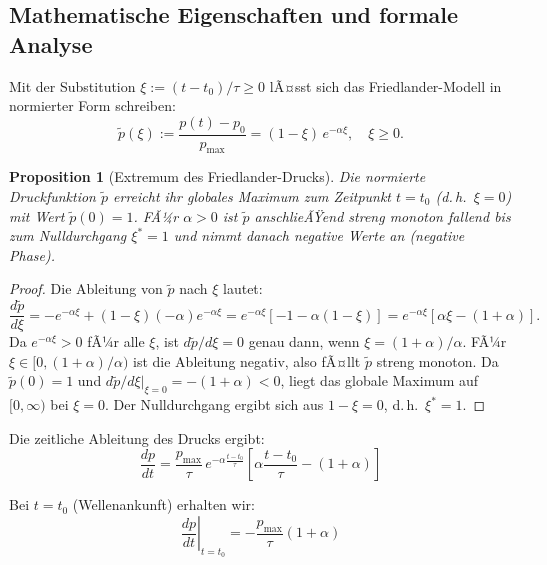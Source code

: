 ﻿\documentclass[12pt,a4paper]{article}
\newtheorem{proposition}[theorem]{Proposition}
\theoremstyle{definition}
\theoremstyle{remark}
\begin{document}
\subsection{Mathematische Eigenschaften und formale Analyse}

Mit der Substitution $\xi := (t - t_0)/\tau \geq 0$ lÃ¤sst sich das Friedlander-Modell in normierter Form schreiben:
\begin{equation}
\tilde{p}(\xi) := \frac{p(t) - p_0}{p_{\text{max}}} = (1 - \xi)\,e^{-\alpha\xi}, \quad \xi \geq 0.
\label{eq:friedlander_norm}
\end{equation}

\begin{proposition}[Extremum des Friedlander-Drucks]
\label{prop:friedlander_max}
Die normierte Druckfunktion $\tilde{p}$ erreicht ihr globales Maximum zum Zeitpunkt $t = t_0$ (d.\,h.~$\xi = 0$) mit Wert $\tilde{p}(0) = 1$. FÃ¼r $\alpha > 0$ ist $\tilde{p}$ anschlieÃŸend streng monoton fallend bis zum Nulldurchgang $\xi^* = 1$ und nimmt danach negative Werte an (negative Phase).
\end{proposition}
\begin{proof}
Die Ableitung von $\tilde{p}$ nach $\xi$ lautet:
\[
\frac{d\tilde{p}}{d\xi} = -e^{-\alpha\xi} + (1-\xi)(-\alpha)e^{-\alpha\xi} = e^{-\alpha\xi}[-1 - \alpha(1-\xi)] = e^{-\alpha\xi}[\alpha\xi - (1+\alpha)].
\]
Da $e^{-\alpha\xi} > 0$ fÃ¼r alle $\xi$, ist $d\tilde{p}/d\xi = 0$ genau dann, wenn $\xi = (1+\alpha)/\alpha$. FÃ¼r $\xi \in [0,(1+\alpha)/\alpha)$ ist die Ableitung negativ, also fÃ¤llt $\tilde{p}$ streng monoton. Da $\tilde{p}(0)=1$ und $d\tilde{p}/d\xi|_{\xi=0} = -(1+\alpha) < 0$, liegt das globale Maximum auf $[0,\infty)$ bei $\xi=0$. Der Nulldurchgang ergibt sich aus $1-\xi=0$, d.\,h.~$\xi^*=1$. 
\end{proof}

Die zeitliche Ableitung des Drucks ergibt:
\begin{equation}
\frac{dp}{dt} = \frac{p_{\text{max}}}{\tau}\,e^{-\alpha \frac{t-t_0}{\tau}} \left[ \alpha\frac{t-t_0}{\tau} - (1+\alpha) \right]
\end{equation}

Bei $t = t_0$ (Wellenankunft) erhalten wir:
\begin{equation}
\left.\frac{dp}{dt}\right|_{t=t_0} = -\frac{p_{\text{max}}}{\tau}(1+\alpha)
\end{equation}
\end{document}
